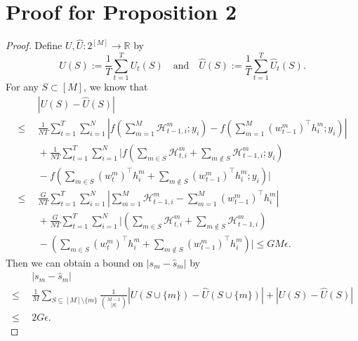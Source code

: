 \section{Proof for Proposition 2}
\begin{proof}
    Define $U,\hat U: 2^{[M]}\to\mathbb{R}$ by 
    \[U(S) := \frac{1}{T}\sum_{t=1}^T U_t(S) \quad\text{and}\quad \hat U(S) := \frac{1}{T}\sum_{t=1}^T \hat U_t(S).\]
    For any $S \subset [M]$, we know that 
    \begin{align*}
        &~|U(S) - \hat U(S)| \\
        \leq~&~\frac{1}{NT}\sum_{t=1}^T\sum_{i=1}^N \left|f\left( \sum_{m=1}^M \mathcal{H}_{t-1, i}^m; y_i\right) - f\left( \sum_{m=1}^M (w^m_{t-1})^\intercal h^m_i; y_i\right)\right| \\
        &~+ \frac{1}{NT}\sum_{t=1}^T\sum_{i=1}^N \bigg|f\left( \sum_{m\in S} \mathcal{H}_{t, i}^m + \sum_{m\notin S} \mathcal{H}_{t-1, i}^m; y_i\right) \\
        &~- f\left( \sum_{m\in S} (w^m_{t})^\intercal h^m_i + \sum_{m\notin S} (w^m_{t-1})^\intercal h^m_i; y_i\right)\bigg|\\
        \leq~&~\frac{G}{NT}\sum_{t=1}^T\sum_{i=1}^N \left|\sum_{m=1}^M \mathcal{H}_{t-1, i}^m -  \sum_{m=1}^M (w^m_{t-1})^\intercal h^m_i\right|\\
        &~+ \frac{G}{NT}\sum_{t=1}^T\sum_{i=1}^N \bigg|\left( \sum_{m\in S} \mathcal{H}_{t, i}^m + \sum_{m\notin S} \mathcal{H}_{t-1, i}^m\right) \\ 
        &~- \left( \sum_{m\in S} (w^m_{t})^\intercal h^m_i + \sum_{m\notin S} (w^m_{t-1})^\intercal h^m_i\right)\bigg| \leq GM\epsilon.
    \end{align*}
    Then we can obtain a bound on $|s_m - \hat s_m|$ by 
    \begin{align*}
        ~&~|s_m - \hat s_m| \\
        \leq ~&~ \frac{1}{M}\sum_{S \subseteq [M] \setminus \{m\}} \frac{1}{\binom{M-1}{|S|}} \left|U(S\cup\{m\}) - \hat U(S\cup\{m\})\right| + \left|U(S) - \hat U(S)\right|\\
        \leq ~&~ 2G\epsilon.
    \end{align*}
\end{proof}


